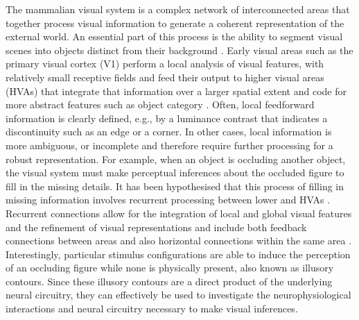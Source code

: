 \documentclass[12pt]{article}
\begin{document}
The mammalian visual system is a complex network of interconnected areas that together process visual information to generate a coherent representation of the external world. An essential part of this process is the ability to segment visual scenes into objects distinct from their background \autocite{kirchbergerEssentialRoleFeedback2020}. Early visual areas such as the primary visual cortex (V1) perform a local analysis of visual features, with relatively small receptive fields and feed their output to higher visual areas (HVAs) that integrate that information over a larger spatial extent and code for more abstract features such as object category \autocite{ashbridgeEffectImageOrientation2000}. Often, local feedforward information is clearly defined, e.g., by a luminance contrast that indicates a discontinuity such as an edge or a corner. In other cases, local information is more ambiguous, or incomplete and therefore require further processing for a robust representation. For example, when an object is occluding another object, the visual system must make perceptual inferences about the occluded figure to fill in the missing details. It has been hypothesised that this process of filling in missing information involves recurrent processing between lower and HVAs \autocite{wyatteEarlyRecurrentFeedback2014}. Recurrent connections allow for the integration of local and global visual features and the refinement of visual representations and include both feedback connections between areas and also horizontal connections within the same area \autocite{shushruthStrongRecurrentNetworks2012}. Interestingly, particular stimulus configurations are able to induce the perception of an occluding figure while none is physically present, also known as illusory contours. Since these illusory contours are a direct product of the underlying neural circuitry, they can effectively be used to investigate the neurophysiological interactions and neural circuitry necessary to make visual inferences.
\end{document}
